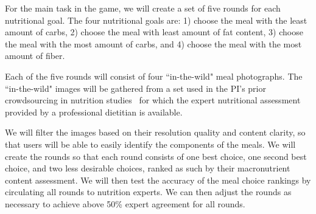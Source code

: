 

For the main task in the game, we will create a set of five rounds for each nutritional goal. 
The four nutritional goals are: 1) choose the meal with the least amount of carbs, 2) choose the meal with least amount of fat content, 3) choose the meal with the most amount of carbs, and 4) choose the meal with the most amount of fiber. 

Each of the five rounds will consist of four ``in-the-wild" meal photographs. 
The ``in-the-wild" images will be gathered from a set used in the PI's prior crowdsourcing in nutrition studies~\cite{desai2019personal,mitchell2019wish} for which the expert nutritional assessment provided by a professional dietitian is available.  

We will filter the images based on their resolution quality and content clarity, so that users will be able to easily identify the components of the meals.
We will create the rounds so that each round consists of one best choice, one second best choice, and two less desirable choices, ranked as such by their macronutrient content assessment. 
We will then test the accuracy of the meal choice rankings by circulating all rounds to nutrition experts. 
We can then adjust the rounds as necessary to achieve above 50\% expert agreement for all rounds.  

